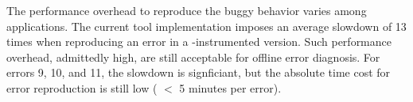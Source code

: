 The performance overhead to reproduce the buggy behavior varies
among applications. The current tool implementation
imposes an average slowdown of 13 times when reproducing
an error in a \ourtool-instrumented version.
Such performance overhead, admittedly high, are still acceptable
for offline error diagnosis.
For errors 9, 10, and 11, the slowdown is signficiant, but the
absolute time cost for error reproduction is still low ( $<$ 5 minutes per error).  





